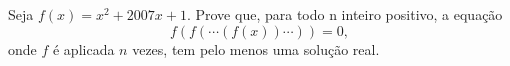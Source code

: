 Seja $f(x) = x^2 + 2007x + 1$. Prove que, para todo n inteiro positivo, a equação
$$f(f(\cdots(f(x))\cdots)) = 0,$$
onde $f$ é aplicada $n$ vezes, tem pelo menos uma solução real.
